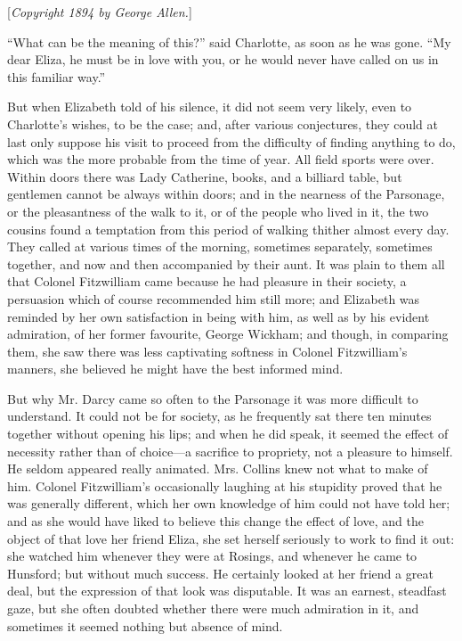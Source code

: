 \documentclass[12pt,openright]{book}
\begin{document}
[\textit{Copyright 1894 by George Allen.}]

“What can be the meaning of this?” said Charlotte, as soon as he was gone. “My dear Eliza, he must be in love with you, or he would never have called on us in this familiar way.”

But when Elizabeth told of his silence, it did not seem very likely, even to Charlotte’s wishes, to be the case; and, after various conjectures, they could at last only suppose his visit to proceed from the difficulty of finding anything to do, which was the more probable from the time of year. All field sports were over. Within doors there was Lady Catherine, books, and a billiard table, but gentlemen cannot be always within doors; and in the nearness of the Parsonage, or the pleasantness of the walk to it, or of the people who lived in it, the two cousins found a temptation from this period of walking thither almost every day. They called at various times of the morning, sometimes separately, sometimes together, and now and then accompanied by their aunt. It was plain to them all that Colonel Fitzwilliam came because he had pleasure in their society, a persuasion which of course recommended him still more; and Elizabeth was reminded by her own satisfaction in being with him, as well as by his evident admiration, of her former favourite, George Wickham; and though, in comparing them, she saw there was less captivating softness in Colonel Fitzwilliam’s manners, she believed he might have the best informed mind.

But why Mr. Darcy came so often to the Parsonage it was more difficult to understand. It could not be for society, as he frequently sat there ten minutes together without opening his lips; and when he did speak, it seemed the effect of necessity rather than of choice—a sacrifice to propriety, not a pleasure to himself. He seldom appeared really animated. Mrs. Collins knew not what to make of him. Colonel Fitzwilliam’s occasionally laughing at his stupidity proved that he was generally different, which her own knowledge of him could not have told her; and as she would have liked to believe this change the effect of love, and the object of that love her friend Eliza, she set herself seriously to work to find it out: she watched him whenever they were at Rosings, and whenever he came to Hunsford; but without much success. He certainly looked at her friend a great deal, but the expression of that look was disputable. It was an earnest, steadfast gaze, but she often doubted whether there were much admiration in it, and sometimes it seemed nothing but absence of mind.
\end{document}
